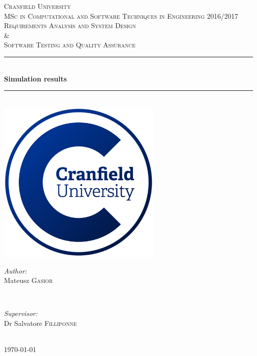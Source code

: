\begin{titlepage}
		\newcommand{\HRule}{\rule{\linewidth}{0.5mm}}
		
		\center
		
		\textsc{\LARGE Cranfield University}\\[1.5cm]
		\textsc{\Large MSc in Computational and Software Techniques in Engineering 2016/2017}\\[0.5cm]
		\textsc{\large Requirements Analysis and System Design \\ \& \\Software Testing and Quality Assurance}\\[0.5cm]
		
		\HRule \\[0.4cm]
		{ \huge \bfseries Simulation results}\\[0.4cm]
		\HRule \\[1.5cm]
		
		\includegraphics[width=8cm]{img/cranfield-logo}\\[1cm]
		
		\vfill
		\begin{minipage}{0.4\textwidth}
			\begin{flushleft} \large
				\emph{Author:}\\
				Mateusz \textsc{Gasior}
			\end{flushleft}
		\end{minipage}
		~
		\begin{minipage}{0.4\textwidth}
			\begin{flushright} \large
				\emph{Supervisor:} \\
				Dr Salvatore \textsc{Filliponne}
			\end{flushright}
		\end{minipage}\\[2cm]
		
		\vfill
		{\large \today}
		\clearpage
	\end{titlepage}
